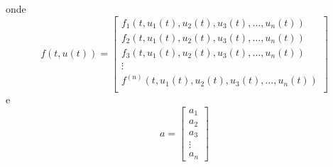 onde
\begin{equation}f(t,u(t))=\left[
\begin{array}{c}
  f_1(t,u_1(t), u_2(t), u_3(t),\ldots, u_n(t))\\
  f_2(t,u_1(t), u_2(t), u_3(t),\ldots, u_n(t))\\
  f_3(t,u_1(t), u_2(t), u_3(t),\ldots, u_n(t))\\
  \vdots\\
  f^{(n)}(t,u_1(t), u_2(t), u_3(t),\ldots, u_n(t))\\
  \end{array}
\right]\end{equation}
e
\begin{equation}a=\left[
\begin{array}{c}
 a_1\\
 a_2\\
 a_3\\
 \vdots\\
 a_n
\end{array}
\right]\end{equation}

